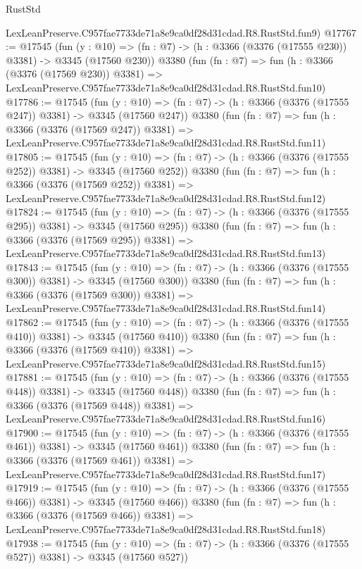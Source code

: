 \begin{lexlean}{RustStd}
\begin{coremodule}
    LexLeanPreserve.C957fae7733de71a8e9ca0df28d31cdad.R8.RustStd.fun9)
@17767 := @17545
    (fun (y : @10) => (fn : @7) -> (h : @3366 (@3376 (@17555 @230)) @3381) -> @3345 (@17560 @230))
    @3380
    (fun (fn : @7) =>
    fun (h : @3366 (@3376 (@17569 @230)) @3381) =>
    LexLeanPreserve.C957fae7733de71a8e9ca0df28d31cdad.R8.RustStd.fun10)
@17786 := @17545
    (fun (y : @10) => (fn : @7) -> (h : @3366 (@3376 (@17555 @247)) @3381) -> @3345 (@17560 @247))
    @3380
    (fun (fn : @7) =>
    fun (h : @3366 (@3376 (@17569 @247)) @3381) =>
    LexLeanPreserve.C957fae7733de71a8e9ca0df28d31cdad.R8.RustStd.fun11)
@17805 := @17545
    (fun (y : @10) => (fn : @7) -> (h : @3366 (@3376 (@17555 @252)) @3381) -> @3345 (@17560 @252))
    @3380
    (fun (fn : @7) =>
    fun (h : @3366 (@3376 (@17569 @252)) @3381) =>
    LexLeanPreserve.C957fae7733de71a8e9ca0df28d31cdad.R8.RustStd.fun12)
@17824 := @17545
    (fun (y : @10) => (fn : @7) -> (h : @3366 (@3376 (@17555 @295)) @3381) -> @3345 (@17560 @295))
    @3380
    (fun (fn : @7) =>
    fun (h : @3366 (@3376 (@17569 @295)) @3381) =>
    LexLeanPreserve.C957fae7733de71a8e9ca0df28d31cdad.R8.RustStd.fun13)
@17843 := @17545
    (fun (y : @10) => (fn : @7) -> (h : @3366 (@3376 (@17555 @300)) @3381) -> @3345 (@17560 @300))
    @3380
    (fun (fn : @7) =>
    fun (h : @3366 (@3376 (@17569 @300)) @3381) =>
    LexLeanPreserve.C957fae7733de71a8e9ca0df28d31cdad.R8.RustStd.fun14)
@17862 := @17545
    (fun (y : @10) => (fn : @7) -> (h : @3366 (@3376 (@17555 @410)) @3381) -> @3345 (@17560 @410))
    @3380
    (fun (fn : @7) =>
    fun (h : @3366 (@3376 (@17569 @410)) @3381) =>
    LexLeanPreserve.C957fae7733de71a8e9ca0df28d31cdad.R8.RustStd.fun15)
@17881 := @17545
    (fun (y : @10) => (fn : @7) -> (h : @3366 (@3376 (@17555 @448)) @3381) -> @3345 (@17560 @448))
    @3380
    (fun (fn : @7) =>
    fun (h : @3366 (@3376 (@17569 @448)) @3381) =>
    LexLeanPreserve.C957fae7733de71a8e9ca0df28d31cdad.R8.RustStd.fun16)
@17900 := @17545
    (fun (y : @10) => (fn : @7) -> (h : @3366 (@3376 (@17555 @461)) @3381) -> @3345 (@17560 @461))
    @3380
    (fun (fn : @7) =>
    fun (h : @3366 (@3376 (@17569 @461)) @3381) =>
    LexLeanPreserve.C957fae7733de71a8e9ca0df28d31cdad.R8.RustStd.fun17)
@17919 := @17545
    (fun (y : @10) => (fn : @7) -> (h : @3366 (@3376 (@17555 @466)) @3381) -> @3345 (@17560 @466))
    @3380
    (fun (fn : @7) =>
    fun (h : @3366 (@3376 (@17569 @466)) @3381) =>
    LexLeanPreserve.C957fae7733de71a8e9ca0df28d31cdad.R8.RustStd.fun18)
@17938 := @17545
    (fun (y : @10) => (fn : @7) -> (h : @3366 (@3376 (@17555 @527)) @3381) -> @3345 (@17560 @527))

\end{coremodule}
\end{lexlean}
